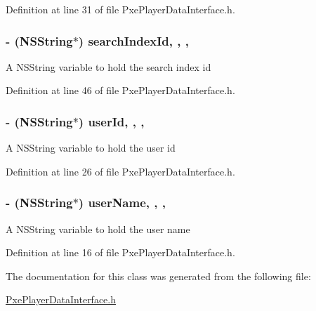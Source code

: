 Definition at line 31 of file Pxe\-Player\-Data\-Interface.\-h.

\hypertarget{interface_pxe_player_data_interface_a6e1589797ac4e892d34cbfcac8de6b89}{
\subsubsection[{search\-Index\-Id}]{\setlength{\rightskip}{0pt plus 5cm}-\/ (N\-S\-String$\ast$) search\-Index\-Id\hspace{0.3cm}{\ttfamily [read]}, {\ttfamily [write]}, {\ttfamily [nonatomic]}, {\ttfamily [strong]}}}\label{interface_pxe_player_data_interface_a6e1589797ac4e892d34cbfcac8de6b89}
A N\-S\-String variable to hold the search index id 

Definition at line 46 of file Pxe\-Player\-Data\-Interface.\-h.

\hypertarget{interface_pxe_player_data_interface_a9b508aa7db14e8852cf251308312db25}{
\subsubsection[{user\-Id}]{\setlength{\rightskip}{0pt plus 5cm}-\/ (N\-S\-String$\ast$) user\-Id\hspace{0.3cm}{\ttfamily [read]}, {\ttfamily [write]}, {\ttfamily [nonatomic]}, {\ttfamily [strong]}}}\label{interface_pxe_player_data_interface_a9b508aa7db14e8852cf251308312db25}
A N\-S\-String variable to hold the user id 

Definition at line 26 of file Pxe\-Player\-Data\-Interface.\-h.

\hypertarget{interface_pxe_player_data_interface_a772cc60134527bb2faa87f197de4e3cc}{
\subsubsection[{user\-Name}]{\setlength{\rightskip}{0pt plus 5cm}-\/ (N\-S\-String$\ast$) user\-Name\hspace{0.3cm}{\ttfamily [read]}, {\ttfamily [write]}, {\ttfamily [nonatomic]}, {\ttfamily [strong]}}}\label{interface_pxe_player_data_interface_a772cc60134527bb2faa87f197de4e3cc}
A N\-S\-String variable to hold the user name 

Definition at line 16 of file Pxe\-Player\-Data\-Interface.\-h.



The documentation for this class was generated from the following file\-:\begin{DoxyCompactItemize}
\item 
\hyperlink{_pxe_player_data_interface_8h}{Pxe\-Player\-Data\-Interface.\-h}\end{DoxyCompactItemize}
